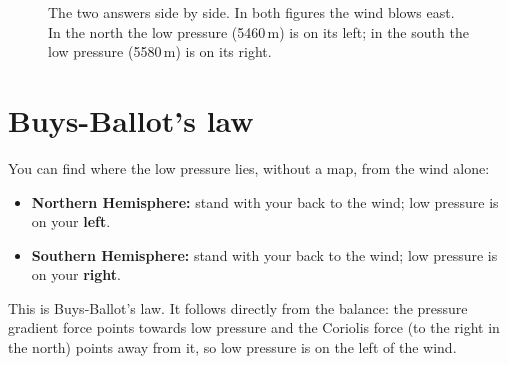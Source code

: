 \begin{figure}[ht]
\centering
{}
\caption{The two answers side by side. In both figures the wind blows east. In the north the low pressure (5460\,m) is on its left; in the south the low pressure (5580\,m) is on its right.}
\end{figure}

\section{Buys-Ballot's law}

You can find where the low pressure lies, without a map, from the wind alone:
\begin{itemize}
\item \textbf{Northern Hemisphere:} stand with your back to the wind; low pressure is on your \textbf{left}.
\item \textbf{Southern Hemisphere:} stand with your back to the wind; low pressure is on your \textbf{right}.
\end{itemize}
This is Buys-Ballot's law. It follows directly from the balance: the pressure gradient force points towards low pressure and the Coriolis force (to the right in the north) points away from it, so low pressure is on the left of the wind.

